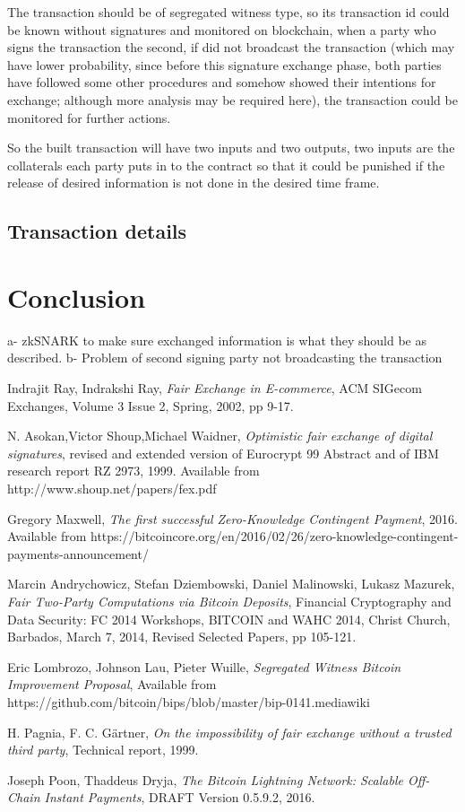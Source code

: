 \documentclass[]{article}
\begin{document}
The transaction should be of segregated witness \cite{segwit} type, so its transaction id could be known without signatures and monitored on blockchain, when a party who signs the transaction the second, if did not broadcast the transaction (which may have lower probability, since before this signature exchange phase, both parties have followed some other procedures and somehow showed their intentions for exchange; although more analysis may be required here), the transaction could be monitored for further actions.

So the built transaction will have two inputs and two outputs, two inputs are the collaterals each party puts in to the contract so that it could be punished if the release of desired information is not done in the desired time frame.

\subsection{Transaction details}

\section{Conclusion}
a- zkSNARK to make sure exchanged information is what they should be as described.
b- Problem of second signing party not broadcasting the transaction

\begin{thebibliography}{9}
	Indrajit Ray, Indrakshi Ray, 
	\textit{Fair Exchange in E-commerce},
	ACM SIGecom Exchanges, Volume 3 Issue 2, Spring, 2002,
	pp 9-17. 
	
	    N. Asokan,Victor Shoup,Michael Waidner,
	    \textit{Optimistic fair exchange of digital signatures},
	    revised and extended version of Eurocrypt 99 Abstract and of IBM research report RZ 2973, 1999. Available from http://www.shoup.net/papers/fex.pdf
		
	Gregory Maxwell,
	\textit{The first successful Zero-Knowledge Contingent Payment}, 2016.
	Available from https://bitcoincore.org/en/2016/02/26/zero-knowledge-contingent-payments-announcement/
	
	Marcin Andrychowicz, Stefan Dziembowski, Daniel Malinowski, Lukasz Mazurek,
	\textit{Fair Two-Party Computations via Bitcoin Deposits}, Financial Cryptography and Data Security: FC 2014 Workshops, BITCOIN and WAHC 2014, Christ Church, Barbados, March 7, 2014, Revised Selected Papers, pp 105-121.
	
	Eric Lombrozo, Johnson Lau, Pieter Wuille,
	\textit{Segregated Witness Bitcoin Improvement Proposal},
	Available from https://github.com/bitcoin/bips/blob/master/bip-0141.mediawiki
	
	H. Pagnia, F. C. Gärtner, 
	\textit{On the impossibility of fair exchange without a trusted
	third party}, Technical report, 1999.

	Joseph Poon, Thaddeus Dryja,
	\textit{The Bitcoin Lightning Network: Scalable Off-Chain Instant Payments}, DRAFT Version 0.5.9.2, 2016.
	    
\end{thebibliography}
\end{document}
